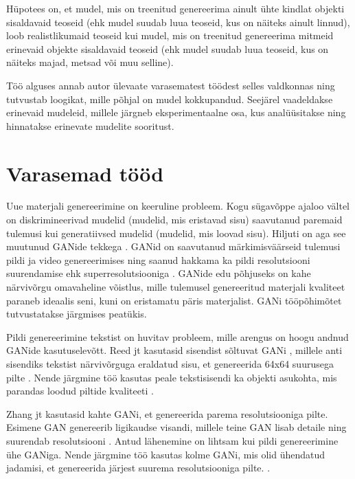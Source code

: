 \documentclass{vilgym}
\begin{document}
	Hüpotees on, et mudel, mis on treenitud genereerima ainult ühte kindlat objekti sisaldavaid teoseid (ehk mudel suudab luua teoseid, kus on näiteks ainult linnud), loob realistlikumaid teoseid kui mudel, mis on treenitud genereerima mitmeid erinevaid objekte sisaldavaid teoseid (ehk mudel suudab luua teoseid, kus on näiteks majad, metsad või muu selline).

	Töö alguses annab autor ülevaate varasematest töödest selles valdkonnas ning tutvustab loogikat, mille põhjal on mudel kokkupandud. Seejärel vaadeldakse erinevaid mudeleid, millele järgneb eksperimentaalne osa, kus analüüsitakse ning hinnatakse erinevate mudelite sooritust. 
	
	\section{Varasemad tööd}

	Uue materjali genereerimine on keeruline probleem. Kogu sügavõppe ajaloo vältel on diskrimineerivad mudelid (mudelid, mis eristavad sisu) saavutanud paremaid tulemusi kui generatiivsed mudelid (mudelid, mis loovad sisu). Hiljuti on aga see muutunud GANide tekkega \parencite{gan}. GANid on saavutanud märkimisväärseid tulemusi pildi \parencite{biggan} ja video genereerimises \parencite{dvdgan} ning saanud hakkama ka pildi resolutsiooni suurendamise ehk superresolutsiooniga \parencite{srgan}. GANide edu põhjuseks on kahe närvivõrgu omavaheline võistlus, mille tulemusel genereeritud materjali kvaliteet paraneb ideaalis seni, kuni on eristamatu päris materjalist. GANi tööpõhimõtet tutvustatakse järgmises peatükis.

	Pildi genereerimine tekstist on huvitav probleem, mille arengus on hoogu andnud GANide kasutuselevõtt. Reed jt kasutasid sisendist sõltuvat GANi , millele anti sisendiks tekstist närvivõrguga eraldatud sisu, et genereerida 64x64 suurusega pilte \parencite{reed}. Nende järgmine töö kasutas peale tekstisisendi ka objekti asukohta, mis parandas loodud piltide kvaliteeti \parencite{reed2}. 

	Zhang jt kasutasid kahte GANi, et genereerida parema resolutsiooniga pilte. Esimene GAN genereerib ligikaudse visandi, millele teine GAN lisab detaile ning suurendab resolutsiooni \parencite{stackgan}. Antud lähenemine on lihtsam kui pildi genereerimine ühe GANiga. Nende järgmine töö kasutas kolme GANi, mis olid ühendatud jadamisi, et genereerida järjest suurema resolutsiooniga pilte. \parencite{stackgan2}.
\end{document}
